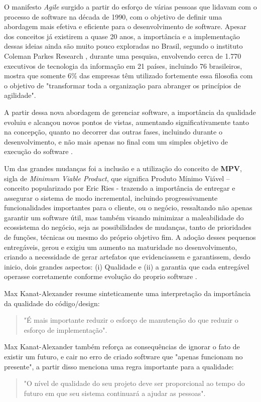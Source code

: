 \documentclass[12pt]{article}
\begin{document}
 O manifesto \textit{Agile} \cite{MANISFESTOAGILE} surgido a partir do esforço de várias pessoas que lidavam com o processo de software na década de 1990, com o objetivo de definir uma abordagem mais efetiva e eficiente para o desenvolvimento de software. Apesar dos conceitos já existirem a quase 20 anos, a importância e a implementação dessas ideias ainda são muito pouco exploradas no Brasil, segundo o instituto Coleman Parkes Research \cite{COLEMANPARKES_AGILE_2017}, durante uma pesquisa, envolvendo cerca de 1.770 executivos de tecnologia da informação em 21 países, incluindo 76 brasileiros, mostra que somente 6\% das empresas têm utilizado fortemente essa filosofia com o objetivo de "transformar toda a organização para abranger os princípios de agilidade".

 A partir dessa nova abordagem de gerenciar software, a importância da qualidade evoluiu e alcançou novos pontos de vistas, aumentando significativamente tanto na concepção, quanto no decorrer das outras fases, incluindo durante o desenvolvimento, e não mais apenas no final com um simples objetivo de execução do software \cite{WATERFALL_MODEL}.
 
 Um das grandes mudanças foi a inclusão e a utilização do conceito de \textbf{MPV}, sigla de \textit{Minimum Viable Product}, que significa Produto Mínimo Viável – conceito popularizado por Eric Ries \cite{ERICRIES_THELEAN} - trazendo a importância de entregar e assegurar o sistema de modo incremental, incluindo progressivamente funcionalidades importantes para o cliente, ou o negócio, ressaltando não apenas garantir um software útil, mas também visando minimizar a maleabilidade do ecossistema do negócio, seja as possibilidades de mudanças, tanto de prioridades de funções, técnicas ou mesmo do próprio objetivo fim. A adoção desses pequenos entregáveis, gerou e exigiu um aumento na maturidade no desenvolvimento, criando a necessidade de gerar artefatos que evidenciassem e garantissem, desdo inicio, dois grandes aspectos: (i) Qualidade e (ii) a garantia que cada entregável operasse corretamente conforme evolução do proprio software \cite{AGILE_WORKING_PROCESS}.

Max Kanat-Alexander \cite{CODE_SIMPLICITY} resume sinteticamente uma interpretação da importância da qualidade do código/design: 
\begin{quote}
 "É mais importante reduzir o esforço de manutenção do que reduzir o esforço de implementação".
\end{quote}

Max Kanat-Alexander \cite{CODE_SIMPLICITY} também reforça as consequências de ignorar o fato de existir um futuro, e cair no erro de criado software que "apenas funcionam no presente", a partir disso menciona uma regra importante para a qualidade: 
\begin{quote}
 "O nível de qualidade do seu projeto deve ser proporcional ao tempo do futuro em que seu sistema continuará a ajudar as pessoas".
\end{quote} 
\end{document}
